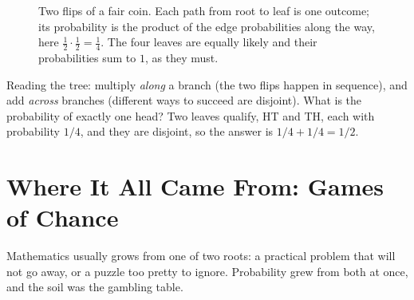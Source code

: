 \begin{figure}[H]
\centering
{}
\caption{Two flips of a fair coin. Each path from root to leaf is one outcome; its
probability is the product of the edge probabilities along the way, here
$\frac12 \cdot \frac12 = \frac14$. The four leaves are equally likely and their
probabilities sum to $1$, as they must.}
\label{ch01:fig-tree}
\end{figure}

Reading the tree: multiply \emph{along} a branch (the two flips happen in
sequence), and add \emph{across} branches (different ways to succeed are disjoint).
What is the probability of exactly one head? Two leaves qualify, HT and TH, each
with probability $1/4$, and they are disjoint, so the answer is
$1/4 + 1/4 = 1/2$. 

\section{Where It All Came From: Games of Chance}
\label{ch01:history}

Mathematics usually grows from one of two roots: a practical problem that will not
go away, or a puzzle too pretty to ignore. Probability grew from both at once, and
the soil was the gambling table.

